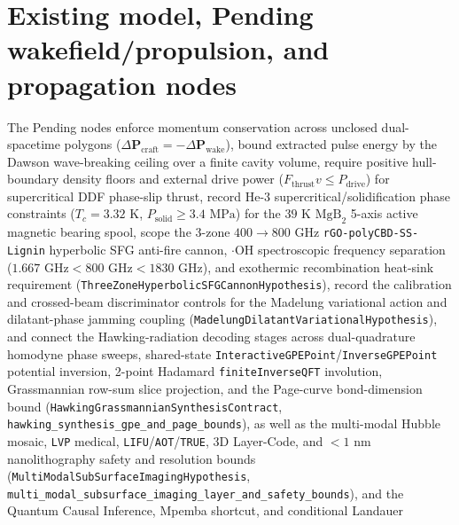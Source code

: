 
\section{Existing model, Pending wakefield/propulsion, and propagation nodes}

The Pending nodes enforce momentum conservation across unclosed dual-spacetime
polygons ($\Delta\mathbf P_{\mathrm{craft}}=-\Delta\mathbf P_{\mathrm{wake}}$),
bound extracted pulse energy by the Dawson wave-breaking ceiling over a finite
cavity volume, require positive hull-boundary density floors and external drive
power ($F_{\mathrm{thrust}} v\le P_{\mathrm{drive}}$) for supercritical DDF
phase-slip thrust, record $\mathrm{He\text{-}3}$ supercritical/solidification
phase constraints ($T_c=3.32\text{ K}$, $P_{\mathrm{solid}}\ge 3.4\text{ MPa}$)
for the $39\text{ K}$ $\mathrm{MgB}_2$ 5-axis active magnetic bearing spool,
scope the 3-zone $400\to 800\text{ GHz}$ \texttt{rGO-polyCBD-SS-Lignin}
hyperbolic SFG anti-fire cannon, $\cdot\mathrm{OH}$ spectroscopic frequency
separation ($1.667\text{ GHz}<800\text{ GHz}<1830\text{ GHz}$), and exothermic
recombination heat-sink requirement (\texttt{ThreeZoneHyperbolicSFGCannonHypothesis}),
record the calibration and crossed-beam discriminator controls for the
Madelung variational action and dilatant-phase jamming coupling
(\texttt{MadelungDilatantVariationalHypothesis}), and connect the Hawking-radiation
decoding stages across dual-quadrature homodyne phase sweeps, shared-state
\texttt{InteractiveGPEPoint}/\texttt{InverseGPEPoint} potential inversion,
2-point Hadamard \texttt{finiteInverseQFT} involution, Grassmannian row-sum
slice projection, and the Page-curve bond-dimension bound
(\texttt{HawkingGrassmannianSynthesisContract}, \texttt{hawking\_synthesis\_gpe\_and\_page\_bounds}),
as well as the multi-modal Hubble mosaic, \texttt{LVP} medical, \texttt{LIFU}/\texttt{AOT}/\texttt{TRUE},
3D Layer-Code, and $<1\text{ nm}$ nanolithography safety and resolution bounds
(\texttt{MultiModalSubSurfaceImagingHypothesis}, \texttt{multi\_modal\_subsurface\_imaging\_layer\_and\_safety\_bounds}),
and the Quantum Causal Inference, Mpemba shortcut, and conditional Landauer
